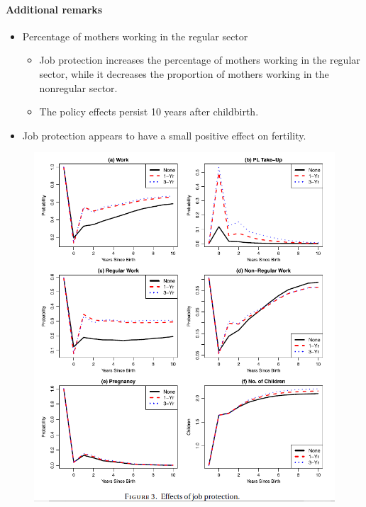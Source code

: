 \documentclass[../root]{subfiles}
\begin{document}
    \paragraph{Additional remarks}

    \begin{itemize}
      \item Percentage of mothers working in the regular sector
      \begin{itemize}
        \item Job protection increases the percentage of mothers working in the regular sector, while it decreases the proportion of mothers working in the nonregular sector.
        \item The policy effects persist 10 years after childbirth.
      \end{itemize}
      \item Job protection appears to have a small positive effect on fertility.
    \end{itemize}


    \begin{figure}[h]
      \centering
      \includegraphics[scale = 1]{0619tanji/F3}
      \label{F3}
    \end{figure}
\end{document}
